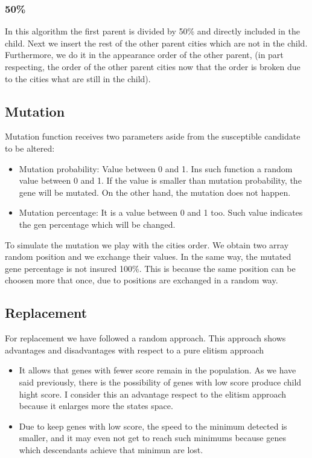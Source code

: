 \documentclass{article}
\begin{document}
\subsubsection{50\%}
In this algorithm the first parent is divided by 50\% and directly included in the child. Next we insert the rest of the other parent cities 
which are not in the child. Furthermore,  we do it in the appearance order of the other parent, (in part respecting, the order of the other parent 
cities now that the order is broken due to the cities what are still in the child). 

\subsection{Mutation}
Mutation function receives two parameters aside from the susceptible candidate to be altered:
\begin{itemize}
    \item Mutation probability: Value between 0 and 1. Ins such function a random value between 0 and 1. If the value is smaller than mutation 
    probability, the gene will be mutated. On the other hand, the mutation does not happen. 
    \item Mutation percentage: It is a value between 0 and 1 too. Such value indicates the gen percentage which will be changed. 
\end{itemize}

To simulate the mutation we play with the cities order. We obtain two array random position and we exchange their values. In the same way, the mutated 
gene percentage is not insured 100\%. This is because the same position can be choosen more that once,  due to positions are exchanged in a random way.

\subsection{Replacement}
For replacement we have followed a random approach. This approach shows advantages and disadvantages with respect to a pure elitism approach
    \begin{itemize}
        \item It allows that genes with fewer score remain in the population. As we have said previously, there is the possibility of genes with low 
        score produce child hight score. I consider this an advantage respect to the elitism approach because it enlarges more the states space.  
        \item Due to keep genes with low score, the speed to the minimum detected is smaller, and it may even not get to reach such minimums 
        because genes which descendants achieve that minimun are lost.
    \end{itemize}  
\end{document}
